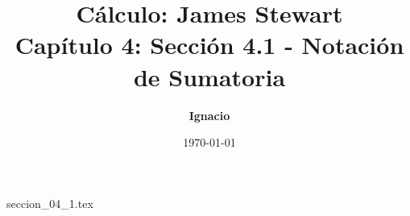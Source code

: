 \documentclass[11pt,spanish,oneside]{report}
\title{\textbf{Cálculo: James Stewart} \\ \Large Capítulo 4: Sección 4.1 - Notación de Sumatoria}
\author{\textbf{Ignacio}}
\date{\today}
\begin{document}
\maketitle

{seccion_04_1.tex}
\end{document}

